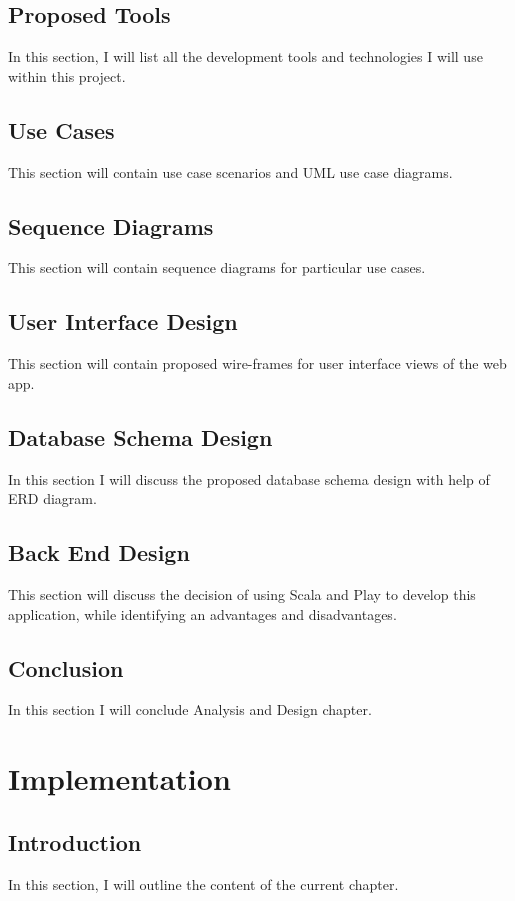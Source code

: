 \documentclass[12pt,twoside,a4paper]{report}
\begin{document}
\section{Proposed Tools}
In this section, I will list all the development tools and technologies I will use within this project.

\section{Use Cases}
This section will contain use case scenarios and UML use case diagrams.

\section{Sequence Diagrams}
This section will contain sequence diagrams for particular use cases.

\section{User Interface Design}
This section will contain proposed wire-frames for user interface views of the web app.

\section{Database Schema Design}
In this section I will discuss the proposed database schema design with help of ERD diagram.

\section{Back End Design}
This section will discuss the decision of using Scala and Play to develop this application, while identifying an advantages and disadvantages.

\section{Conclusion}
In this section I will conclude Analysis and Design chapter.

\chapter{Implementation}
\section{Introduction}
In this section, I will outline the content of the current chapter.
\end{document}
